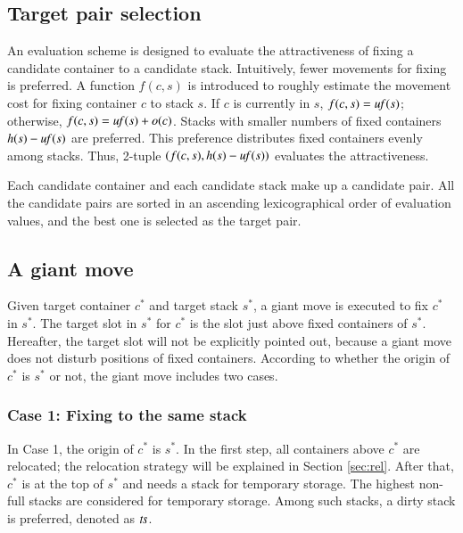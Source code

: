 \documentclass[review,3p,times,authoryear,12pt]{elsarticle}
\begin{document}
\subsection{Target pair selection}
\label{sec:tar}
An evaluation scheme is designed to evaluate the attractiveness of fixing a candidate container to a candidate stack.
Intuitively, fewer movements for fixing is preferred. A function $f(c,s)$ is introduced to roughly estimate the movement cost for fixing container $c$ to stack $s$. If $c$ is currently in $s$, $f(c,s)=\id{uf}(s)$; otherwise, $f(c,s)=\id{uf}(s)+o(c)$. Stacks with smaller numbers of fixed containers $h(s)-\id{uf}(s)$ are preferred. This preference distributes fixed containers evenly among stacks. Thus, 2-tuple $(f(c,s), h(s)-\id{uf}(s))$ evaluates the attractiveness.

Each candidate container and each candidate stack make up a candidate pair. All the candidate pairs are sorted in an ascending lexicographical order of evaluation values, and the best one is selected as the target pair.

\subsection{A giant move}

Given target container $c^*$ and target stack $s^*$, a giant move is executed to fix $c^*$ in $s^*$. The target slot in $s^*$ for $c^*$ is the slot just above fixed containers of $s^*$. Hereafter, the target slot will not be explicitly pointed out, because a giant move does not disturb positions of fixed containers. According to whether the origin of $c^*$ is $s^*$ or not, the giant move includes two cases. 

\subsubsection{Case 1: Fixing to the same stack}

In Case 1, the origin of $c^*$ is $s^*$. In the first step, all containers above $c^*$ are relocated; the relocation strategy will be explained in Section \ref{sec:rel}. After that, $c^*$ is at the top of $s^*$ and needs a stack for temporary storage. The highest non-full stacks are considered for temporary storage. Among such stacks, a dirty stack is preferred, denoted as $\id{ts}$.
\end{document}
